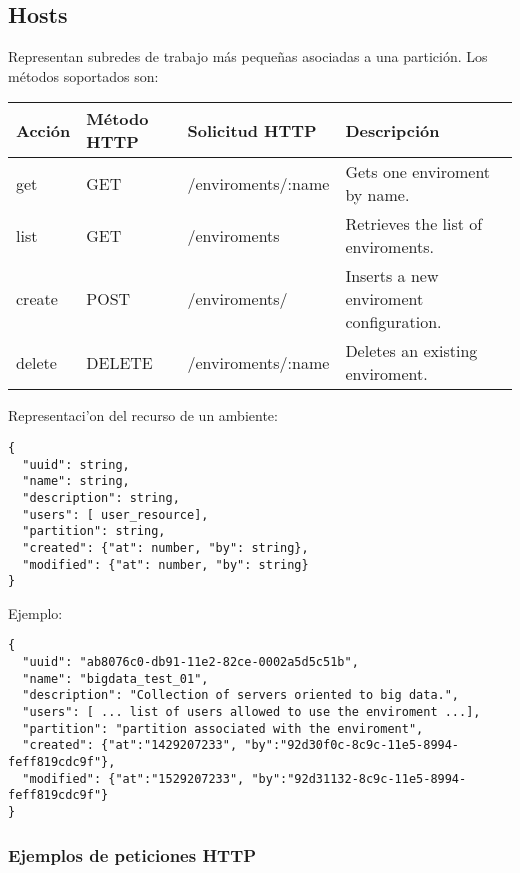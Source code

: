\subsection{Hosts}
Representan subredes de trabajo más pequeñas asociadas a una partición. Los métodos soportados son:

\begin{center}
 \begin{tabular}{| l | l | l | l |}
 \hline
  \rowcolor{blueapi}
  \textbf{Acción} & \textbf{Método HTTP} & \textbf{Solicitud HTTP} & \textbf{Descripción} \\ [0.5ex] 
  \hline\hline
  get & GET & /enviroments/:name & Gets one enviroment by name. \\
  \hline
  list & GET & /enviroments & Retrieves the list of enviroments. \\
  \hline  
  create & POST & /enviroments/ & Inserts a new enviroment configuration. \\
  \hline
  delete & DELETE & /enviroments/:name & Deletes an existing enviroment. \\
  \hline
\end{tabular}
\end{center}

Representaci'on del recurso de un ambiente:

\medskip
\begin{lstlisting}[style=json]
{
  "uuid": string,
  "name": string,
  "description": string, 
  "users": [ user_resource],
  "partition": string,
  "created": {"at": number, "by": string},
  "modified": {"at": number, "by": string}
}
\end{lstlisting}

Ejemplo:

\medskip
\begin{lstlisting}[style=json]
{
  "uuid": "ab8076c0-db91-11e2-82ce-0002a5d5c51b",
  "name": "bigdata_test_01",
  "description": "Collection of servers oriented to big data.", 
  "users": [ ... list of users allowed to use the enviroment ...],
  "partition": "partition associated with the enviroment",
  "created": {"at":"1429207233", "by":"92d30f0c-8c9c-11e5-8994-feff819cdc9f"},
  "modified": {"at":"1529207233", "by":"92d31132-8c9c-11e5-8994-feff819cdc9f"}
}
\end{lstlisting}

\subsubsection{Ejemplos de peticiones HTTP}

